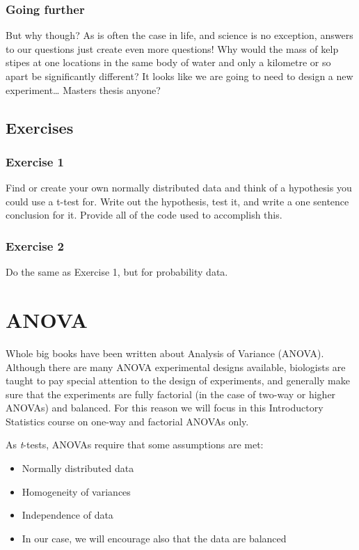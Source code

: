 \documentclass[english,10pt,a4paper,oneside]{book}
\providecommand{\tightlist}{%
  \setlength{\itemsep}{0pt}\setlength{\parskip}{0pt}}
\theoremstyle{definition}
\theoremstyle{definition}
\theoremstyle{definition}
\theoremstyle{remark}
\begin{document}
\subsection{Going further}\label{going-further}

But why though? As is often the case in life, and science is no
exception, answers to our questions just create even more questions! Why
would the mass of kelp stipes at one locations in the same body of water
and only a kilometre or so apart be significantly different? It looks
like we are going to need to design a new experiment\ldots{} Masters
thesis anyone?

\section{Exercises}\label{exercises-3}

\subsection{Exercise 1}\label{exercise-1-3}

Find or create your own normally distributed data and think of a
hypothesis you could use a t-test for. Write out the hypothesis, test
it, and write a one sentence conclusion for it. Provide all of the code
used to accomplish this.

\subsection{Exercise 2}\label{exercise-2}

Do the same as Exercise 1, but for probability data.

\chapter{ANOVA}\label{anova}

Whole big books have been written about Analysis of Variance (ANOVA).
Although there are many ANOVA experimental designs available, biologists
are taught to pay special attention to the design of experiments, and
generally make sure that the experiments are fully factorial (in the
case of two-way or higher ANOVAs) and balanced. For this reason we will
focus in this Introductory Statistics course on one-way and factorial
ANOVAs only.

As \emph{t}-tests, ANOVAs require that some assumptions are met:

\begin{itemize}
\tightlist
\item
  Normally distributed data
\item
  Homogeneity of variances
\item
  Independence of data
\item
  In our case, we will encourage also that the data are balanced
\end{itemize}
\end{document}
